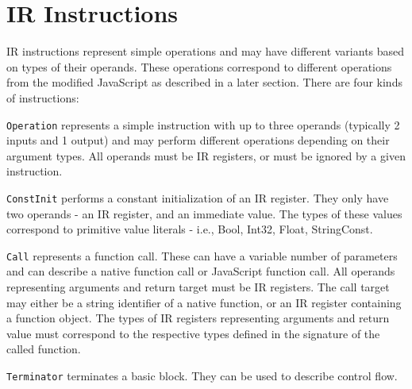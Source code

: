 \section{IR Instructions}

IR instructions represent simple operations and may have different variants based on types of their operands. These operations correspond to different operations from the modified JavaScript as described in a later section. There are four kinds of instructions:


\texttt{Operation} represents a simple instruction with up to three operands (typically 2 inputs and 1 output) and may perform different operations depending on their argument types. All operands must be IR registers, or must be ignored by a given instruction.

\texttt{ConstInit} performs a constant initialization of an IR register. They only have two operands - an IR register, and an immediate value. The types of these values correspond to primitive value literals - i.e., Bool, Int32, Float, StringConst.

\texttt{Call} represents a function call. These can have a variable number of parameters and can describe a native function call or JavaScript function call. All operands representing arguments and return target must be IR registers. The call target may either be a string identifier of a native function, or an IR register containing a function object. The types of IR registers representing arguments and return value must correspond to the respective types defined in the signature of the called function.

\texttt{Terminator} terminates a basic block. They can be used to describe control flow.


